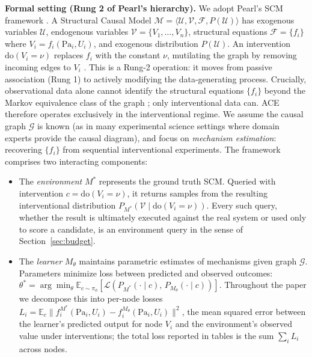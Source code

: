 \documentclass{article}
\theoremstyle{plain}
\theoremstyle{definition}
\theoremstyle{remark}
\begin{document}
\textbf{Formal setting (Rung 2 of Pearl's hierarchy).} We adopt Pearl's SCM framework \citep{pearl2009causality,pearl1995causal}. A Structural Causal Model $\mathcal{M} = \langle \mathcal{U}, \mathcal{V}, \mathcal{F}, P(\mathcal{U}) \rangle$ has exogenous variables $\mathcal{U}$, endogenous variables $\mathcal{V} = \{V_1, \ldots, V_n\}$, structural equations $\mathcal{F} = \{f_i\}$ where $V_i = f_i(\text{Pa}_i, U_i)$, and exogenous distribution $P(\mathcal{U})$. An intervention $\text{do}(V_i = \nu)$ replaces $f_i$ with the constant $\nu$, mutilating the graph by removing incoming edges to $V_i$ \citep{pearl2009causality}. This is a Rung-2 operation: it moves from passive association (Rung 1) to actively modifying the data-generating process. Crucially, observational data alone cannot identify the structural equations $\{f_i\}$ beyond the Markov equivalence class of the graph \citep{spirtes2000causation,peters2017elements}; only interventional data can. ACE therefore operates exclusively in the interventional regime. We assume the causal graph $\mathcal{G}$ is known (as in many experimental science settings where domain experts provide the causal diagram), and focus on \emph{mechanism estimation}: recovering $\{f_i\}$ from sequential interventional experiments. The framework comprises two interacting components:

\begin{itemize}[leftmargin=1.2em,topsep=0.2em,itemsep=0.1em]
\item The \emph{environment} $M^*$ represents the ground truth SCM. Queried with intervention $c = \text{do}(V_i = \nu)$, it returns samples from the resulting interventional distribution $P_{M^*}(\mathcal{V} \mid \text{do}(V_i = \nu))$. Every such query, whether the result is ultimately executed against the real system or used only to score a candidate, is an environment query in the sense of Section~\ref{sec:budget}.
\item The \emph{learner} $M_\theta$ maintains parametric estimates of mechanisms given graph $\mathcal{G}$. Parameters minimize loss between predicted and observed outcomes: $\theta^* = \arg\min_\theta \mathbb{E}_{c \sim \pi_\phi}[\mathcal{L}(P_{M^*}(\cdot\mid c),\, P_{M_\theta}(\cdot\mid c))]$. Throughout the paper we decompose this into per-node losses $L_i = \mathbb{E}_{c}\|f_i^{M^*}(\text{Pa}_i, U_i) - f_i^{M_\theta}(\text{Pa}_i, U_i)\|^2$, the mean squared error between the learner's predicted output for node $V_i$ and the environment's observed value under interventions; the total loss reported in tables is the sum $\sum_i L_i$ across nodes.
\end{itemize}
\end{document}
